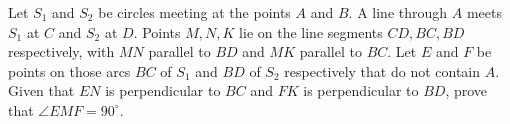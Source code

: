 Let $S_1$ and $S_2$ be circles meeting at the points $A$ and $B$. A line through $A$ meets $S_1$ at $C$ and $S_2$ at $D$. Points $M, N, K$ lie on the line segments $CD, BC, BD$ respectively, with $MN$ parallel to $BD$ and $MK$ parallel to $BC$. Let $E$ and $F$ be points on those arcs $BC$ of $S_1$ and $BD$ of $S_2$ respectively that do not contain $A$. Given that $EN$ is perpendicular to $BC$ and $FK$ is perpendicular to $BD$, prove that $\angle EMF = 90^\circ$.
